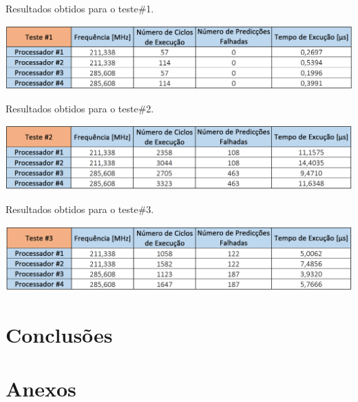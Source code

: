 \documentclass[11pt]{article}
\numberwithin{equation}{section}
\begin{document}
\begin{table}[H]
	\centering
	\caption{Resultados obtidos para o teste$\#$1.}
	\vspace{-1.5mm}
	\includegraphics[keepaspectratio=true, scale=0.40]{tabelas/teste1}
	\label{tab:teste1}
\end{table}

\begin{table}[H]
	\centering
	\caption{Resultados obtidos para o teste$\#$2.}
	\vspace{-1.5mm}
	\includegraphics[keepaspectratio=true, scale=0.40]{tabelas/teste2}
	\label{tab:teste2}
\end{table}

\begin{table}[H]
	\centering
	\caption{Resultados obtidos para o teste$\#$3.}
	\vspace{-1.5mm}
	\includegraphics[keepaspectratio=true, scale=0.40]{tabelas/teste3}
	\label{tab:teste3}
\end{table}

\section{Conclusões}

\pagebreak

\section{Anexos}

\listoftodos
\end{document}
